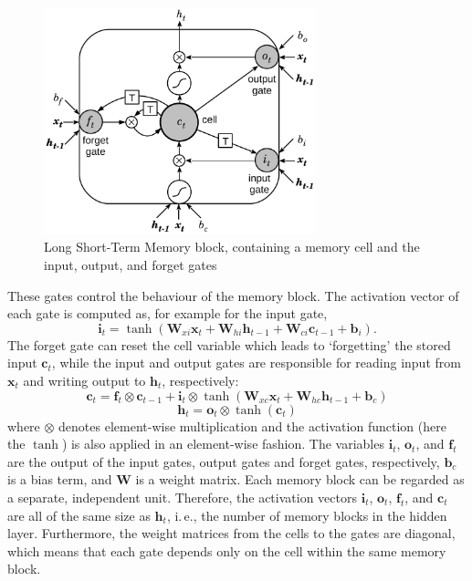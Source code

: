 \begin{figure}[h]
	\centering
	\includegraphics[width=0.7\textwidth]{img/lstm}
	\caption[LSTM]{Long Short-Term Memory block, containing a memory cell and the input, output, and forget gates}
	\label{fig:lstm}
\end{figure}

These gates control the behaviour of the memory block.
The activation vector of each gate is computed as, for example for the input gate,
\begin{equation}
\boldsymbol{i}_t = \tanh(\boldsymbol{W}_{xi}\boldsymbol{x}_t + \boldsymbol{W}_{hi}\boldsymbol{h}_{t-1} + \boldsymbol{W}_{ci}\boldsymbol{c}_{t-1} + \boldsymbol{b}_i).
\label{eq:lstmgate}
\end{equation}
The forget gate can reset the cell variable which leads to `forgetting' the stored input $\boldsymbol{c}_t$,
while the input and output gates are responsible for reading input from $\boldsymbol{x}_t$ and writing output to $\boldsymbol{h}_t$, respectively:
\begin{equation}
\boldsymbol{c}_t = \boldsymbol{f}_t \otimes \boldsymbol{c}_{t-1} + \boldsymbol{i}_t \otimes \tanh(\boldsymbol{W}_{xc}\boldsymbol{x}_t + \boldsymbol{W}_{hc}\boldsymbol{h}_{t-1} + \boldsymbol{b}_c)
\label{eq:lstmcell}
\end{equation}
\begin{equation}
\boldsymbol{h}_t = \boldsymbol{o}_t \otimes \tanh (\boldsymbol{c}_t)
\label{eq:lstmoutput}
\end{equation}
where $\otimes$ denotes element-wise multiplication and the activation function (here the $\tanh$) is also applied in an element-wise fashion.
The variables $\boldsymbol{i}_t$, $\boldsymbol{o}_t$, and $\boldsymbol{f}_t$ are the output of the input gates, output gates and forget gates, respectively, $\boldsymbol{b}_c$ is a bias term, and $\boldsymbol{W}$ is a weight matrix.
Each memory block can be regarded as a separate, independent unit.
Therefore, the activation vectors $\boldsymbol{i}_t$, $\boldsymbol{o}_t$, $\boldsymbol{f}_t$, and $\boldsymbol{c}_t$ are all of the same size as $\boldsymbol{h}_t$, i.\,e., the number of memory blocks in the hidden layer.
Furthermore, the weight matrices from the cells to the gates are diagonal, which means that each gate depends only on the cell within the same memory block.


